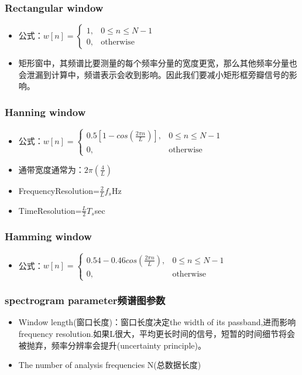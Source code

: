 \documentclass[UTF8]{ctexart}
\begin{document}
\subsubsection{Rectangular window}
\begin{itemize}
    \item 公式：$w[n] = \begin{cases} 1, & 0 \leq n \leq N-1 \\ 0, & \text{otherwise} \end{cases}$
    \item 矩形窗中，其频谱比要测量的每个频率分量的宽度更宽，那么其他频率分量也会泄漏到计算中，频谱表示会收到影响。因此我们要减小矩形框旁瓣信号的影响。
\end{itemize}

\subsubsection{Hanning window}
\begin{itemize}
    \item 公式：$w[n] = \begin{cases} 0.5[1-cos(\frac{2\pi n}{L})], & 0 \leq n \leq N-1 \\ 0, & \text{otherwise} \end{cases}$
    \item 通带宽度通常为：$2\pi(\frac{4}{L})$
    \item FrequencyResolution=$\frac{2}{L}f_{s}$Hz
    \item TimeResolution=$\frac{L}{2}T_{s}$sec
\end{itemize}

\subsubsection{Hamming window}
\begin{itemize}
    \item 公式：$w[n] = \begin{cases} 0.54-0.46cos(\frac{2\pi n}{L}), & 0 \leq n \leq N-1 \\ 0, & \text{otherwise} \end{cases}$
\end{itemize}

\subsubsection{spectrogram parameter频谱图参数}

\begin{itemize}
    \item Window length(窗口长度)：窗口长度决定the width of its passband,进而影响frequency resolution.如果L很大，平均更长时间的信号，短暂的时间细节将会被抛弃，频率分辨率会提升(uncertainty principle)。
    \item The number of analysis frequencies N(总数据长度)
\end{itemize}
\end{document}
